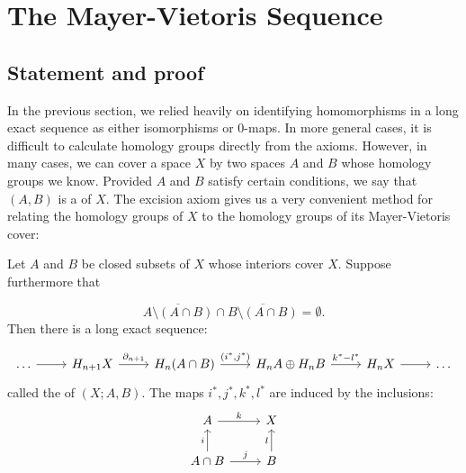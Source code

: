 \section{The Mayer-Vietoris Sequence}\label{sec-mayer-vietoris}
\subsection{Statement and proof}
In the previous section, we relied heavily on identifying homomorphisms in a long exact sequence as either isomorphisms or $0$-maps. In more general cases, it is difficult to calculate homology groups directly from the axioms. However, in many cases, we can cover a space $X$ by two spaces $A$ and $B$ whose homology groups we know. Provided $A$ and $B$ satisfy certain conditions, we say that $(A,B)$ is a  of $X$. The excision axiom gives us a very convenient method for relating the homology groups of $X$ to the homology groups of its Mayer-Vietoris cover:

\begin{theorem}\label{mayer-vietoris}
Let $A$ and $B$ be closed subsets of $X$ whose interiors cover $X$. Suppose furthermore that  


$$\overline{A\setminus(A\cap B)}\cap \overline{B\setminus(A\cap B)}=\emptyset.$$
Then there is a long exact sequence:

\[\begin{tikzcd}
\dots \arrow[r] & H_{n+1}X \arrow[r, "\partial_{n+1}"] & H_n(A\cap B) \arrow[r, "{(i^*,j^*)}"] & H_n A \dsum H_n B \arrow[r, "k^*-l^*"] & H_n X \arrow[r] & \dots
\end{tikzcd}\]
called the  of $(X;A,B)$. The maps $i^*,j^*,k^*,l^*$ are induced by the inclusions:
\[\begin{tikzcd}
A \arrow[r, "k"]                      & X                \\
A\cap B \arrow[u, "i"] \arrow[r, "j"] & B \arrow[u, "l"]
\end{tikzcd}\]
\end{theorem}


